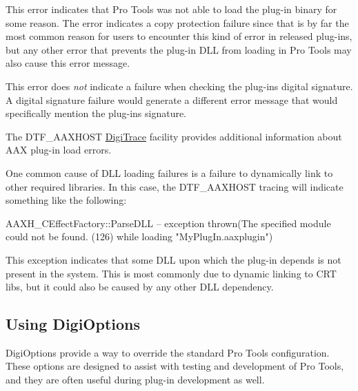 \begin{DoxyItemize}
\item This error indicates that Pro Tools was not able to load the plug-\/in binary for some reason. The error indicates a copy protection failure since that is by far the most common reason for users to encounter this kind of error in released plug-\/ins, but any other error that prevents the plug-\/in D\+LL from loading in Pro Tools may also cause this error message.

This error does {\itshape not} indicate a failure when checking the plug-\/in\textquotesingle{}s digital signature. A digital signature failure would generate a different error message that would specifically mention the plug-\/in\textquotesingle{}s signature.

The {\ttfamily D\+T\+F\+\_\+\+A\+A\+X\+H\+O\+ST} \mbox{\hyperlink{a00834}{Digi\+Trace}} facility provides additional information about A\+AX plug-\/in load errors.

One common cause of D\+LL loading failures is a failure to dynamically link to other required libraries. In this case, the {\ttfamily D\+T\+F\+\_\+\+A\+A\+X\+H\+O\+ST} tracing will indicate something like the following\+: 
\begin{DoxyItemize}
\item \begin{DoxyVerb}AAXH_CEffectFactory::ParseDLL – exception thrown(The specified module could not be found. (126) while loading "MyPlugIn.aaxplugin")
\end{DoxyVerb}
  
\end{DoxyItemize}

This exception indicates that some D\+LL upon which the plug-\/in depends is not present in the system. This is most commonly due to dynamic linking to C\+RT libs, but it could also be caused by any other D\+LL dependency.  
\end{DoxyItemize}



 \hypertarget{a00830_aax_pro_tools_guide_06c_digioptions}{}\subsection{Using Digi\+Options}\label{a00830_aax_pro_tools_guide_06c_digioptions}
Digi\+Options provide a way to override the standard Pro Tools configuration. These options are designed to assist with testing and development of Pro Tools, and they are often useful during plug-\/in development as well.

